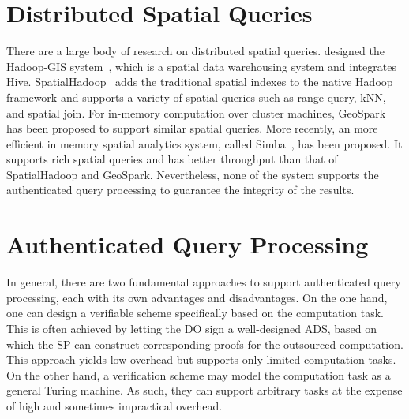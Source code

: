 \section{Distributed Spatial Queries}

There are a large body of research on distributed spatial queries. \citeauthor{10.14778/2536222.2536227} designed the Hadoop-GIS system~\cite{10.14778/2536222.2536227}, which is a spatial data warehousing system and integrates Hive. SpatialHadoop~\cite{10.1109/icde.2015.7113382} adds the traditional spatial indexes to the native Hadoop framework and supports a variety of spatial queries such as range query, kNN, and spatial join. For in-memory computation over cluster machines, GeoSpark~\cite{10.1145/2820783.2820860} has been proposed to support similar spatial queries. More recently, an more efficient in memory spatial analytics system, called Simba~\cite{10.1145/2882903.2915237}, has been proposed. It supports rich spatial queries and has better throughput than that of SpatialHadoop and GeoSpark. Nevertheless, none of the system supports the authenticated query processing to guarantee the integrity of the results.

\section{Authenticated Query Processing}

In general, there are two fundamental approaches to support authenticated query processing, each with its own advantages and disadvantages. On the one hand, one can design a verifiable scheme specifically based on the computation task. This is often achieved by letting the DO sign a well-designed ADS, based on which the SP can construct corresponding proofs for the outsourced computation. This approach yields low overhead but supports only limited computation tasks. On the other hand, a verification scheme may model the computation task as a general Turing machine. As such, they can support arbitrary tasks at the expense of high and sometimes impractical overhead.

